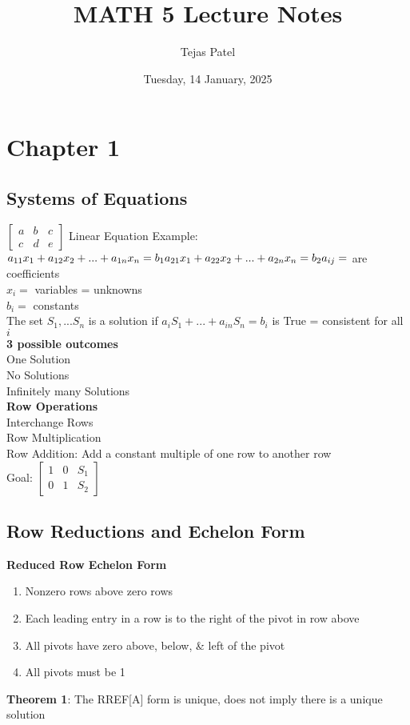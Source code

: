 \documentclass{article}
\title{MATH 5 Lecture Notes}
\date{Tuesday, 14 January, 2025}
\author{Tejas Patel}
\begin{document}
\maketitle
\tableofcontents
\pagebreak
\section{Chapter 1}
\subsection{Systems of Equations}
$
\left[\begin{array}{cc|c}
a & b & c \\
c & d & e
\end{array}\right]
$
Linear Equation Example:\\
$
a_{11}x_1 +a_{12}x_2 +...+ a_{1n}x_n =b_1\\
a_{21}x_1 +a_{22}x_2 +...+ a_{2n}x_n =b_2\\
a_{ij} = $ are coefficients\\ $
x_i = $ variables = unknowns\\ $
b_i =$ constants\\ 
The set $S_1, ... S_n$ is a solution if  $a_iS_1 +...+a_{in}S_n=b_i$ is True = consistent for all $i$
\\ \textbf{3 possible outcomes}\\
One Solution \\ No Solutions \\ Infinitely many Solutions
\\ \textbf{Row Operations}
\\Interchange Rows \\ Row Multiplication \\ Row Addition: Add a constant multiple of one row to another row
\\ Goal: $
\left[\begin{array}{cc|c}
1 & 0 & S_1 \\
0 & 1 & S_2
\end{array}\right]
$
\subsection{Row Reductions and Echelon Form}
\textbf{Reduced Row Echelon Form}
\begin{enumerate}
    \item Nonzero rows above zero rows
    \item Each leading entry in a row is to the right of the pivot in row above
    \item All pivots have zero above, below, \& left of the pivot
    \item All pivots must be 1
\end{enumerate}
\textbf{Theorem 1}: The RREF[A] form is unique, does not imply there is a unique solution
\end{document}
